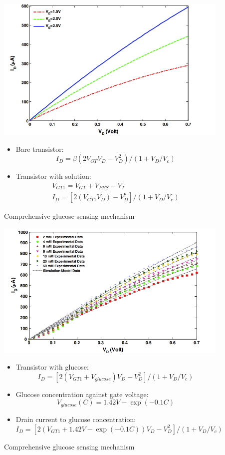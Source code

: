 \documentclass[fontsize=11pt,aspectratio=169,t,fleqn]{beamer}
\begin{document}
\begin{frame}
  \begin{figure}[h!]
    \includegraphics[width=0.4\linewidth,scale=0.4]{fig/bare_SWCNT.png}
    \caption{Comprehensive glucose sensing mechanism}
    \begin{itemize}
      \item  Bare transistor: \begin{equation} I_D=\beta(2V_{GT}V_D-V_{D}^2)/(1+V_D/V_c) \end{equation}
      \item  Transistor with solution:\begin{align}
        V_{GT1}= V_{GT} + V_{PBS}-V_{T}\\
        I_D=[2(V_{GT1}V_D)-V_{D}^2]/(1+V_D/V_c)
      \end{align}
    \end{itemize}
    
        
  \end{figure}
\end{frame}     
  

\begin{frame}
  \begin{figure}[h!]
    \includegraphics[width=0.4\linewidth,scale=0.4]{fig/glucose_SWCNT.png}
    \caption{Comprehensive glucose sensing mechanism}
    \begin{itemize}
      \item Transistor with glucose:\begin{equation}
      I_D=[2(V_{GT1}+V_{glucose})V_D-V_D^2]/(1+V_D/V_c)\end{equation}
      \item Glucose concentration against gate voltage:\begin{equation}
      V_{glucose}(C)= 1.42 V-\exp{(-0.1C)}\end{equation}
      \item Drain current to glucose concentration:\begin{equation}
      I_D=[2(V_{GT1}+1.42 V-\exp{(-0.1C)})V_D-V_D^2]/(1+V_D/V_c)\end{equation}
    \end{itemize}
  \end{figure}
\end{frame}
\end{document}
